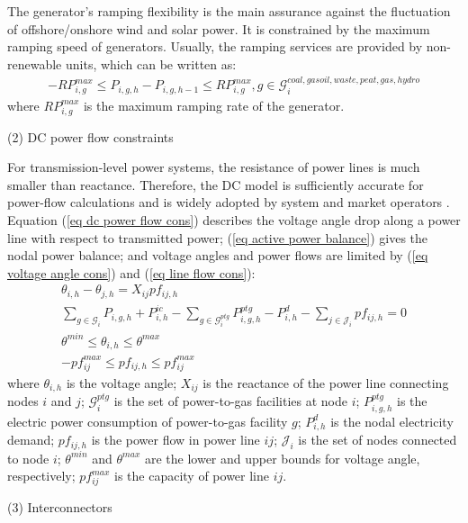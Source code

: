 \documentclass[sn-mathphys,Numbered]{sn-jnl}%
\theoremstyle{plain}%
\theoremstyle{definition}%
\theoremstyle{remark}%
\begin{document}
The generator's ramping flexibility is the main assurance against the fluctuation of offshore/onshore wind and solar power. It is constrained by the maximum ramping speed of generators. Usually, the ramping services are provided by non-renewable units, which can be written as:
\begin{gather}
    -RP_{i,g}^{max} \leq P_{i,g,h} - P_{i,g,h-1} \leq RP_{i,g}^{max}, g \in \mathcal{G}_i^{coal,gasoil, waste, peat, gas, hydro}
\end{gather}
where $RP_{i,g}^{max}$ is the maximum ramping rate of the generator.

(2) DC power flow constraints

For transmission-level power systems, the resistance of power lines is much smaller than reactance. Therefore, the DC model is sufficiently accurate for power-flow calculations and is widely adopted by system and market operators \cite{stott2009dc}. Equation (\ref{eq dc power flow cons}) describes the voltage angle drop along a power line with respect to transmitted power; (\ref{eq active power balance}) gives the nodal power balance; and voltage angles and power flows are limited by (\ref{eq voltage angle cons}) and (\ref{eq line flow cons}):
\begin{gather}
    \theta_{i,h} - \theta_{j,h} = X_{ij} pf_{ij,h}
\label{eq dc power flow cons}\\
    \sum_{g \in \mathcal{G}_i}{P_{i,g,h}}
    + P^{ic}_{i,h}
    - \sum_{g \in \mathcal{G}_i^{ptg}}{P_{i,g,h}^{ptg}}
    - P_{i,h}^{d}
    - \sum_{j \in \mathcal{J}_i}{pf_{ij,h}} = 0
\label{eq active power balance} \\
    \theta^{min} \leq \theta_{i,h} \leq \theta^{max}
\label{eq voltage angle cons}    \\
 - pf_{ij}^{max} \leq pf_{ij,h} \leq pf_{ij}^{max}
\label{eq line flow cons}
\end{gather}
where $\theta_{i,h}$ is the voltage angle; $X_{ij}$ is the reactance of the power line connecting nodes $i$ and $j$; $\mathcal{G}_i^{ptg}$ is the set of power-to-gas facilities at node $i$; $P_{i,g,h}^{ptg}$ is the electric power consumption of power-to-gas facility $g$; $P_{i,h}^{d}$ is the nodal electricity demand; $pf_{ij,h}$ is the power flow in power line $ij$; $\mathcal{J}_i$ is the set of nodes connected to node $i$; $\theta^{min}$ and $\theta^{max}$ are the lower and upper bounds for voltage angle, respectively; $pf_{ij}^{max}$ is the capacity of power line $ij$.

(3) Interconnectors
\end{document}
